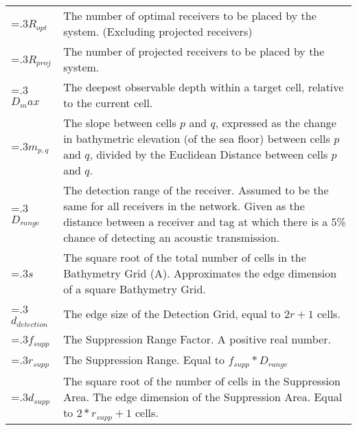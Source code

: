 \begin{tabularx}{\linewidth}{@{}>{\hsize=.3\hsize}X>{\hsize=1.5\hsize}X@{}}
	$R_{opt}$ & The number of optimal receivers to be placed by the system. (Excluding projected receivers)\\
	
	$R_{proj}$ & The number of projected receivers to be placed by the system.\\
	
	$D_max$& The deepest observable depth within a target cell, relative to the current cell.\\
	
	$m_{p,q}$&The slope between cells $p$ and $q$, expressed as the change in bathymetric elevation (of the sea floor) between cells $p$ and $q$, divided by the Euclidean Distance between cells $p$ and $q$.\\
	
	$D_{range}$ & The detection range of the receiver.  Assumed to be the same for all receivers in the network.  Given as the distance between a receiver and tag at which there is a 5\% chance of detecting an acoustic transmission.\\

	$s$ & The square root of the total number of cells in the Bathymetry Grid (A).  Approximates the edge dimension of a square Bathymetry Grid.\\
	$d_{detection}$& The edge size of the Detection Grid, equal to $2r+1$ cells.\\
	$f_{supp}$ & The Suppression Range Factor.  A positive real number.\\
	$r_{supp}$ & The Suppression Range. Equal to $f_{supp}*D_{range}$\\
	$d_{supp}$ & The square root of the number of cells in the Suppression Area.  The edge dimension of the Suppression Area.  Equal to $2*r_{supp} + 1$ cells.\\

\end{tabularx}
